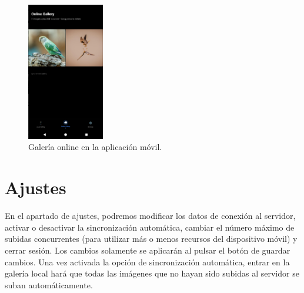 \begin{figure}[H]
  \centering
  \includegraphics[width=0.3\textwidth]{assets/online-gallery-mobile.png}
  \caption{Galería online en la aplicación móvil.}
  \label{fig:online-gallery-mobile}
\end{figure}

\section{Ajustes}
En el apartado de ajustes, podremos modificar los datos de conexión al servidor, activar o desactivar la sincronización automática, cambiar el número máximo de subidas concurrentes (para utilizar más o menos recursos del dispositivo móvil) y cerrar sesión. Los cambios solamente se aplicarán al pulsar el botón de guardar cambios. Una vez activada la opción de sincronización automática, entrar en la galería local hará que todas las imágenes que no hayan sido subidas al servidor se suban automáticamente.

